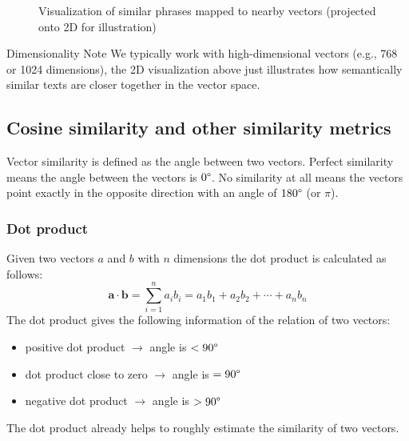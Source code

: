 \begin{figure}[htbp]
    \centering
    \caption{Visualization of similar phrases mapped to nearby vectors (projected onto 2D for illustration)}
    \label{fig:vector-embeddings}
\end{figure}

\begin{remark}{Dimensionality Note}{}
    \noindent We typically work with high-dimensional vectors (e.g., 768 or 1024 dimensions), the 2D visualization above just illustrates how semantically similar texts are closer together in the vector space.
\end{remark}

\subsection{Cosine similarity and other similarity metrics}
Vector similarity is defined as the angle between two vectors.
Perfect similarity means the angle between the vectors is $0\degree$.
No similarity at all means the vectors point exactly in the opposite direction with an angle of $180\degree$ (or $\pi$).

\subsubsection{Dot product}
Given two vectors $a$ and $b$ with $n$ dimensions the dot product is calculated as follows:
$$\mathbf{a} \cdot \mathbf{b} = \sum_{i=1}^n a_i b_i = a_1b_1 + a_2b_2 + \cdots + a_nb_n$$
The dot product gives the following information of the relation of two vectors:
\begin{itemize}
    \item positive dot product $\rightarrow$ angle is $<90\degree$
    \item dot product close to zero $\rightarrow$ angle is $=90\degree$
    \item negative dot product $\rightarrow$ angle is $>90\degree$
\end{itemize}
The dot product already helps to roughly estimate the similarity of two vectors.

